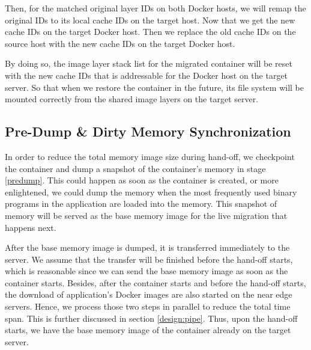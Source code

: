 Then, for the matched original layer IDs on both Docker hosts, we will remap the original IDs to its local cache IDs on the target host. Now that we get the new cache IDs on the target Docker host. Then we replace the old cache IDs on the source host with the new cache IDs on the target Docker host.  

By doing so, the image layer stack list for the migrated container will be reset with the new cache IDs that is addressable for the Docker host on the target server. So that when we restore the container in the future, its file system will be mounted correctly from the shared image layers on the target server.






\subsection{Pre-Dump \& Dirty Memory Synchronization} \label{design:memDiff}

In order to reduce the total memory image size during hand-off, we checkpoint the container and dump a snapshot of the container's memory in stage \ref{predump}. This could happen as soon as the container is created, or more enlightened, we could dump the memory when the most frequently used binary programs in the application are loaded into the memory. This snapshot of memory will be served as the base memory image for the live migration that happens next.

After the base memory image is dumped, it is transferred immediately to the server. We assume that the transfer will be finished before the hand-off starts, which is reasonable since we can send the base memory image as soon as the container starts. 
Besides, after the container starts and before the hand-off starts, the download of application's Docker images are also started on the near edge servers. 
Hence, we process those two steps in parallel to reduce the total time span. This is further discussed in section \ref{design:pipe}. Thus, upon the hand-off starts, we have the base memory image of the container already on the target server. 

